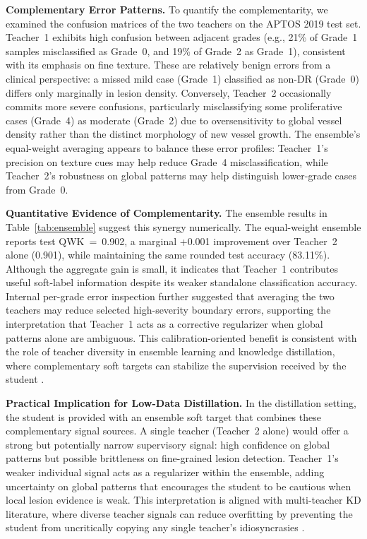 \documentclass[a4paper,fleqn]{cas-dc}
\begin{document}
\textbf{Complementary Error Patterns.} To quantify the complementarity, we examined the confusion matrices of the two teachers on the APTOS 2019 test set. Teacher~1 exhibits high confusion between adjacent grades (e.g., 21\% of Grade~1 samples misclassified as Grade~0, and 19\% of Grade~2 as Grade~1), consistent with its emphasis on fine texture. These are relatively benign errors from a clinical perspective: a missed mild case (Grade~1) classified as non-DR (Grade~0) differs only marginally in lesion density. Conversely, Teacher~2 occasionally commits more severe confusions, particularly misclassifying some proliferative cases (Grade~4) as moderate (Grade~2) due to oversensitivity to global vessel density rather than the distinct morphology of new vessel growth. The ensemble's equal-weight averaging appears to balance these error profiles: Teacher~1's precision on texture cues may help reduce Grade~4 misclassification, while Teacher~2's robustness on global patterns may help distinguish lower-grade cases from Grade~0.


\textbf{Quantitative Evidence of Complementarity.} The ensemble results in Table~\ref{tab:ensemble} suggest this synergy numerically. The equal-weight ensemble reports test QWK~=~0.902, a marginal +0.001 improvement over Teacher~2 alone (0.901), while maintaining the same rounded test accuracy (83.11\%). Although the aggregate gain is small, it indicates that Teacher~1 contributes useful soft-label information despite its weaker standalone classification accuracy. Internal per-grade error inspection further suggested that averaging the two teachers may reduce selected high-severity boundary errors, supporting the interpretation that Teacher~1 acts as a corrective regularizer when global patterns alone are ambiguous. This calibration-oriented benefit is consistent with the role of teacher diversity in ensemble learning and knowledge distillation, where complementary soft targets can stabilize the supervision received by the student \cite{gou2021,nabavi2024}.

\textbf{Practical Implication for Low-Data Distillation.} In the distillation setting, the student is provided with an ensemble soft target that combines these complementary signal sources. A single teacher (Teacher~2 alone) would offer a strong but potentially narrow supervisory signal: high confidence on global patterns but possible brittleness on fine-grained lesion detection. Teacher~1's weaker individual signal acts as a regularizer within the ensemble, adding uncertainty on global patterns that encourages the student to be cautious when local lesion evidence is weak. This interpretation is aligned with multi-teacher KD literature, where diverse teacher signals can reduce overfitting by preventing the student from uncritically copying any single teacher's idiosyncrasies \cite{gou2021,nabavi2024,hossain2025}.
\end{document}
